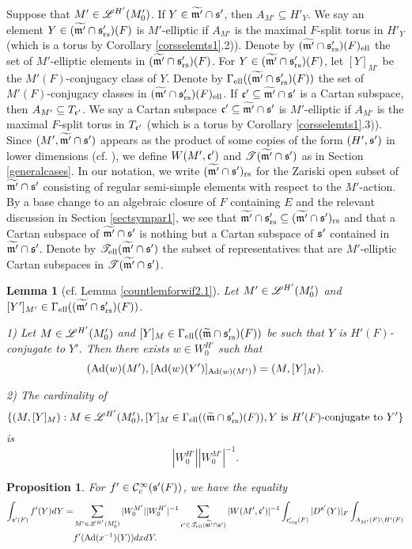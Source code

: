 \documentclass[a4paper]{amsart}
\newcommand{\fm}{{\mathfrak{m}}} \newcommand{\fn}{{\mathfrak{n}}}\newcommand{\fo}{{\mathfrak{o}}} \newcommand{\fp}{{\mathfrak{p}}}
\newcommand{\wt}{\widetilde}                        \newcommand{\wh}{\widehat}                      \newcommand{\wpair}[1]{\left\{{#1}\right\}}
\newtheorem{lem}[thm]{Lemma}
\newtheorem{prop}[thm]{Proposition}
\theoremstyle{definition}
\theoremstyle{remark}
\numberwithin{equation}{subsection}
\begin{document}
Suppose that $M'\in\mathscr{L}^{H'}(M'_0)$. If $Y\in\wt{\fm'}\cap\fs'$, then $A_{M'}\subseteq H'_Y$. We say an element $Y\in(\wt{\fm'}\cap\fs'_\rs)(F)$ is $M'$-elliptic if $A_{M'}$ is the maximal $F$-split torus in $H'_Y$ (which is a torus by Corollary \ref{corsselemts1}.2)). Denote by $(\wt{\fm'}\cap\fs'_\rs)(F)_\el$ the set of $M'$-elliptic elements in $(\wt{\fm'}\cap\fs'_\rs)(F)$. For $Y\in(\wt{\fm'}\cap\fs'_\rs)(F)$, let $[Y]_{M'}$ be the $M'(F)$-conjugacy class of $Y$. Denote by $\Gamma_\el((\wt{\fm'}\cap\fs'_\rs)(F))$ the set of $M'(F)$-conjugacy classes in $(\wt{\fm'}\cap\fs'_\rs)(F)_\el$. If $\fc'\subseteq\wt{\fm'}\cap\fs'$ is a Cartan subspace, then $A_{M'}\subseteq T_{{\mathfrak{c}}'}$. We say a Cartan subspace $\fc'\subseteq\wt{\fm'}\cap\fs'$ is $M'$-elliptic if $A_{M'}$ is the maximal $F$-split torus in $T_{{\mathfrak{c}}'}$ (which is a torus by Corollary \ref{corsselemts1}.3)). Since $(M', \wt{\fm'}\cap\fs')$ appears as the product of some copies of the form $(H',{\mathfrak{s}}')$ in lower dimensions (cf. \cite[beginning of \S5]{MR4350885}), we define $W(M',{\mathfrak{c}}')$ and $\mst(\wt{\fm'}\cap\fs')$ as in Section \ref{generalcases}. In our notation, we write $(\wt{\fm'}\cap\fs')_\rs$ for the Zariski open subset of $\wt{\fm'}\cap\fs'$ consisting of regular semi-simple elements with respect to the $M'$-action. By a base change to an algebraic closure of $F$ containing $E$ and the relevant discussion in Section \ref{sectsympar1}, we see that $\wt{\fm'}\cap\fs'_\rs\subseteq(\wt{\fm'}\cap\fs')_\rs$ and that a Cartan subspace of $\wt{\fm'}\cap\fs'$ is nothing but a Cartan subspace of ${\mathfrak{s}}'$ contained in $\wt{\fm'}\cap\fs'$. Denote by $\mst_\el(\wt{\fm'}\cap\fs')$ the subset of representatives that are $M'$-elliptic Cartan subspaces in $\mst(\wt{\fm'}\cap\fs')$. 

\begin{lem}[cf. Lemma \ref{countlemforwif2.1}]\label{countlemforwif2.2}
Let $M'\in\mathscr{L}^{H'}(M'_0)$ and $[Y']_{M'}\in\Gamma_\el((\wt{\fm'}\cap\fs'_\rs)(F))$. 

1) Let $M\in\mathscr{L}^{H'}(M'_0)$ and $[Y]_{M}\in\Gamma_\el((\wt{\fm}\cap\fs'_\rs)(F))$ be such that $Y$ is $H'(F)$-conjugate to $Y'$. Then there exists $w\in W_0^{H'}$ such that
$$ ({\mathrm{Ad}}(w)(M'), [{\mathrm{Ad}}(w)(Y')]_{{\mathrm{Ad}}(w)(M')})=(M, [Y]_{M}). $$ 

2) The cardinality of
$$ \{(M, [Y]_{M}): M\in\msl^{H'}(M'_0), [Y]_{M}\in\Gamma_\el((\wt{\fm}\cap\fs'_\rs)(F)), \text{$Y$ is $H'(F)$-conjugate to $Y'$}\} $$
is 
$$ |W_0^{H'}||W_0^{M'}|^{-1}. $$
\end{lem}

\begin{prop}\label{wif2.2}
For $f'\in{\mathcal {C}}_c^\infty({\mathfrak{s}}'(F))$, we have the equality 
\[\begin{split}
 \int_{\fs'(F)} f'(Y) dY=&\sum_{M'\in\msl^{H'}(M'_0)} |W_0^{M'}||W_0^{H'}|^{-1} \sum_{\fc'\in\mst_\el(\wt{\fm'}\cap\fs')} |W(M', \fc')|^{-1} \int_{\fc'_\reg(F)} |D^{\fs'}(Y)|_F \int_{A_{M'}(F)\bs H'(F)} \\
 &f'(\Ad(x^{-1})(Y)) dx dY. 
\end{split}\]
\end{prop}
\end{document}
